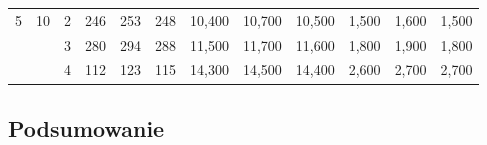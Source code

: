 \documentclass[licencjacka]{pracamgr}
\begin{document}
\begin{table}[H]
{\begin{tabular}{@{}cccccccccccc@{}}
5                                                              & 10                                                     & 2    & 246                                                    & 253                                                    & 248                                                       & 10,400                                                    & 10,700                                                     & 10,500                                                        & 1,500                                                              & 1,600                                                               & 1,500                                                                 \\
                                                               &                                                        & 3    & 280                                                    & 294                                                    & 288                                                       & 11,500                                                    & 11,700                                                     & 11,600                                                        & 1,800                                                              & 1,900                                                               & 1,800                                                                 \\
                                                               &                                                        & 4    & 112                                                    & 123                                                    & 115                                                       & 14,300                                                    & 14,500                                                     & 14,400                                                        & 2,600                                                              & 2,700                                                               & 2,700                                                                 \\ \bottomrule
\end{tabular}%
}
\end{table}

\subsection{Podsumowanie}
\end{document}

